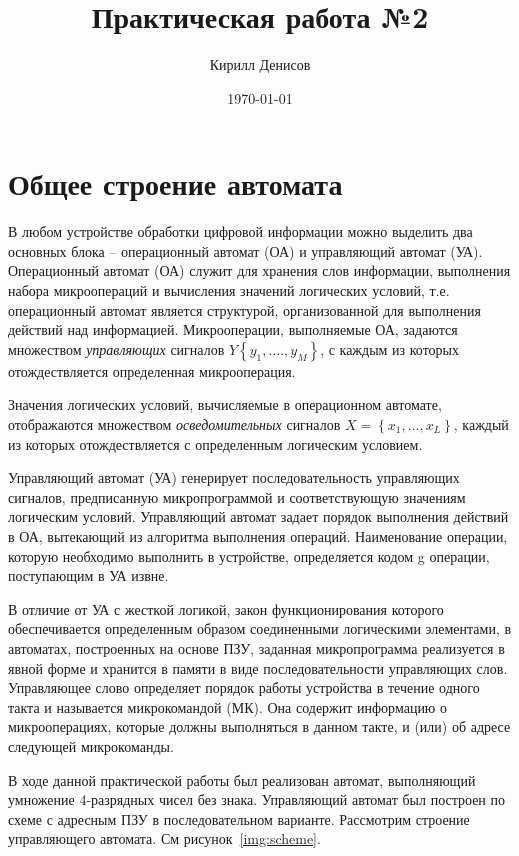 \documentclass[a4paper,14pt]{extarticle}
\author{Кирилл Денисов}
\title{Практическая работа №2}
\date{\today}
\newcommand{\pathToCommonFolder}{/home/denilai/Desktop/LaTeX/Common}
\begin{document}
	\thispagestyle{empty}
	
	
	
	\newpage
	\tableofcontents
	\newpage
	
\section{Общее строение автомата}
В любом устройстве обработки цифровой информации можно выделить два основных блока – операционный автомат (ОА) и управляющий автомат (УА). Операционный автомат (ОА) служит для хранения слов информации, выполнения набора микроопераций и вычисления значений логических условий, т.е. операционный автомат является структурой, организованной для выполнения действий над информацией. Микрооперации, выполняемые ОА, задаются множеством \textit{управляющих} сигналов $Y\left\{y_1,....,y_M\right\}$, с каждым из которых отождествляется определенная микрооперация.

Значения логических условий, вычисляемые в операционном автомате, отображаются множеством \textit{осведомительных} сигналов $X=\left\{x_1,...,x_L\right\}$, каждый из которых отождествляется с определенным логическим условием.

Управляющий автомат (УА) генерирует последовательность управляющих сигналов, предписанную микропрограммой и соответствующую значениям логическим условий. Управляющий автомат задает порядок выполнения действий в ОА, вытекающий из алгоритма выполнения операций. Наименование операции, которую необходимо выполнить в устройстве, определяется кодом g операции, поступающим в УА извне. 

В отличие от УА с жесткой логикой, закон функционирования которого обеспечивается определенным образом соединенными логическими элементами, в автоматах, построенных на основе ПЗУ, заданная микропрограмма реализуется в явной форме и хранится в памяти в виде последовательности управляющих слов. Управляющее слово определяет порядок работы устройства в течение одного такта и называется микрокомандой (МК). Она содержит информацию о микрооперациях, которые должны выполняться в данном такте, и (или) об адресе следующей микрокоманды.

В ходе данной практической работы был реализован автомат, выполняющий умножение 4-разрядных чисел без знака. Управляющий автомат был построен по схеме с адресным ПЗУ в последовательном варианте. Рассмотрим строение управляющего автомата. См рисунок~\ref{img:scheme}.
\end{document}
